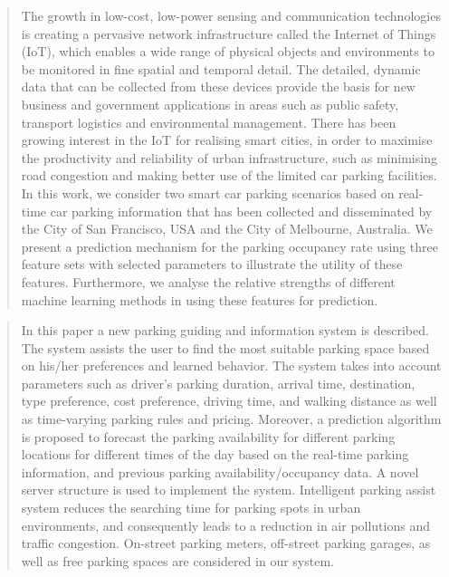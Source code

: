 \documentclass[journal,10pt]{IEEEtran}
\begin{document}
\begin{quote}
  The growth in low-cost, low-power sensing and communication technologies is creating a pervasive network infrastructure called the Internet of Things (IoT), which enables a wide range of physical objects and environments to be monitored in fine spatial and temporal detail. The detailed, dynamic data that can be collected from these devices provide the basis for new business and government applications in areas such as public safety, transport logistics and environmental management. There has been growing interest in the IoT for realising smart cities, in order to maximise the productivity and reliability of urban infrastructure, such as minimising road congestion and making better use of the limited car parking facilities. In this work, we consider two smart car parking scenarios based on real-time car parking information that has been collected and disseminated by the City of San Francisco, USA and the City of Melbourne, Australia. We present a prediction mechanism for the parking occupancy rate using three feature sets with selected parameters to illustrate the utility of these features. Furthermore, we analyse the relative strengths of different machine learning methods in using these features for prediction.
  \cite{Zheng2015}
\end{quote}

\begin{quote}
  In this paper a new parking guiding and information system is described. The system assists the user to find the most suitable parking space based on his/her preferences and learned behavior. The system takes into account parameters such as driver's parking duration, arrival time, destination, type preference, cost preference, driving time, and walking distance as well as time-varying parking rules and pricing. Moreover, a prediction algorithm is proposed to forecast the parking availability for different parking locations for different times of the day based on the real-time parking information, and previous parking availability/occupancy data. A novel server structure is used to implement the system. Intelligent parking assist system reduces the searching time for parking spots in urban environments, and consequently leads to a reduction in air pollutions and traffic congestion. On-street parking meters, off-street parking garages, as well as free parking spaces are considered in our system.
  \cite{Rajabioun2013}
\end{quote}
\end{document}
